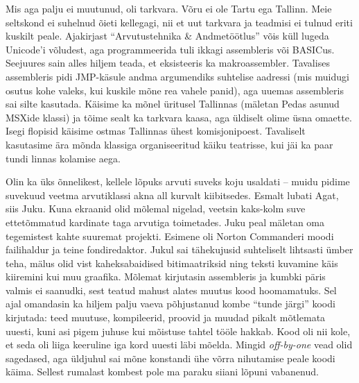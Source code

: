Mis aga palju ei muutunud, oli tarkvara. Võru ei ole Tartu ega 
Tallinn. Meie seltskond ei suhelnud õieti kellegagi, nii et uut tarkvara ja
teadmisi ei tulnud eriti kuskilt peale. Ajakirjast \enquote{Arvutustehnika \& 
Andmetöötlus} 
võis küll lugeda Unicode'i võludest, aga programmeerida tuli ikkagi 
assembleris või BASICus. Seejuures sain alles hiljem teada, et eksisteeris 
ka makroassembler. Tavalises assembleris pidi JMP-käsule andma argumendiks 
suhtelise aadressi (mis muidugi osutus kohe valeks, kui kuskile mõne rea 
vahele panid), aga 
uuemas assembleris sai silte kasutada. Käisime ka mõnel üritusel Tallinnas (mäletan 
Pedas asunud MSXide klassi) 
ja tõime sealt ka tarkvara kaasa, aga üldiselt olime üsna omaette. Isegi 
flopisid käisime ostmas Tallinnas ühest komisjonipoest. Tavaliselt kasutasime ära mõnda klassiga organiseeritud käiku teatrisse, kui jäi 
ka paar tundi linnas kolamise aega. 

Olin ka üks õnnelikest, kellele lõpuks arvuti suveks koju usaldati -- muidu pidime 
suvekuud veetma arvutiklassi akna all kurvalt kiibitsedes. Esmalt lubati
Agat, siis Juku. Kuna ekraanid olid mõlemal nigelad, veetsin kaks-kolm suve 
ettetõmmatud kardinate taga arvutiga toimetades. Juku peal mäletan oma tegemistest kahte 
suuremat projekti. Esimene oli Norton Commanderi moodi failihaldur ja teine 
fondiredaktor. Jukul sai tähekujusid suhteliselt lihtsasti ümber teha, mälus 
olid vist kaheksabaidised bitimaatriksid ning teksti kuvamine käis kiiremini 
kui muu graafika. Mõlemat kirjutasin assembleris ja kumbki päris valmis ei 
saanudki, sest teatud mahust alates muutus kood hoomamatuks. Sel ajal omandasin 
ka hiljem palju vaeva põhjustanud kombe \enquote{tunde järgi} koodi kirjutada: 
teed muutuse, kompileerid, proovid ja muudad pikalt mõtlemata uuesti, kuni 
asi pigem juhuse kui mõistuse tahtel tööle hakkab. Kood oli
nii kole, et seda oli liiga keeruline iga kord uuesti läbi mõelda. Mingid 
\emph{off-by-one} vead olid sagedased, aga üldjuhul sai mõne konstandi ühe võrra 
nihutamise peale koodi käima. Sellest rumalast kombest pole ma paraku siiani lõpuni 
vabanenud. 

